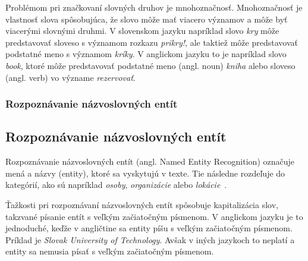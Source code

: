 Problémom pri značkovaní slovných druhov je mnohoznačnosť. Mnohoznačnosť je vlastnosť slova spôsobujúca, že slovo môže mať viacero významov a môže byť viacerými slovnými druhmi. V slovenskom jazyku napríklad slovo \textit{kry} môže predstavovať sloveso s významom rozkazu \textit{prikry!}, ale taktiež môže predstavovať podstatné meno s významom \textit{kríky}. V anglickom jazyku to je napríklad slovo \textit{book}, ktoré môže predstavovať podstatné meno (angl. noun) \textit{kniha} alebo sloveso (angl. verb) vo význame \textit{rezervovať}.

%
%
{
	\subsubsection{Rozpoznávanie názvoslovných entít}
}
{
	\subsection{Rozpoznávanie názvoslovných entít}
}
\label{subsubsec:ner}
Rozpoznávanie názvoslovných entít (angl. Named Entity Recognition) označuje mená a názvy (entity), ktoré sa vyskytujú v texte. Tie následne rozdeľuje do kategórií, ako sú napríklad \textit{osoby}, \textit{organizácie} alebo \textit{lokácie}~\cite{collobert2011}.

Ťažkosti pri rozpoznávaní názvoslovných entít spôsobuje kapitalizácia slov, takzvané písanie entít s veľkým začiatočným písmenom. V anglickom jazyku je to jednoduché, keďže v angličtine sa entity píšu s veľkým začiatočným písmenom.
\\

Príklad je \textit{Slovak University of Technology}. Avšak v iných jazykoch to neplatí a entity sa nemusia písať s veľkým začiatočným písmenom.

